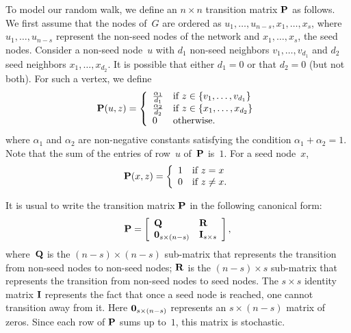 To model our random walk, we define an $n \times n$ transition matrix $\mathbf{P}$ 
as follows. We first assume that the nodes of~$G$ are ordered as 
$u_1, \ldots, u_{n - s}, x_{1}, \ldots, x_{s}$, where $u_1, \ldots, u_{n - s}$
represent the non-seed nodes of the network and $x_1, \ldots, x_s$, the seed nodes.
Consider a non-seed node~$u$ with $d_1$ non-seed neighbors $v_1, \ldots, v_{d_1}$
and $d_2$ seed neighbors $x_1, \ldots, x_{d_2}$. It is possible that either $d_1 = 0$
or that $d_2 = 0$ (but not both). For such a vertex, we define
\begin{equation}\label{eqn:defining_prob_nonseed}
	\mathbf{P}(u, z) = \left \{ 
							\begin{array}{ll}
								\frac{\alpha_1}{d_1} & \mbox{if } z \in \{v_1, \ldots, v_{d_1}\} \\
                                \frac{\alpha_2}{d_2} & \mbox{if } z \in \{x_1, \ldots, x_{d_2}\} \\
								0			& \mbox{otherwise.}
							\end{array}
						\right.
\end{equation}
where $\alpha_1$ and $\alpha_2$ are non-negative constants satisfying the condition
$\alpha_1 + \alpha_2 = 1$. Note that the sum of the entries of row~$u$ of~$\mathbf{P}$
is~$1$. 
For a seed node~$x$, 
\begin{equation}\label{eqn:defining_prob_seed}
	\mathbf{P}(x,z) = 	\left \{ 
						\begin{array}{ll}
							1 & \mbox{if $z = x$} \\
							0 & \mbox{if $z \neq x$.}
						\end{array}
					\right.
\end{equation}

It is usual to write the transition matrix $\mathbf{P}$ in the following canonical form:
\begin{equation}\label{eqn:canonical_form_P}
	\mathbf{P} = 	\left [ \begin{array}{ll}
						\mathbf{Q}  & \mathbf{R} \\
						 \mathbf{0}_{s \times (n - s)} & \mathbf{I}_{s \times s}
						\end{array}
				\right ],
\end{equation}
where~$\mathbf{Q}$ is the $(n - s) \times (n - s)$ sub-matrix that represents the transition 
from non-seed nodes to non-seed nodes; $\mathbf{R}$ is the $(n - s) \times s$ sub-matrix 
that represents the transition from non-seed nodes to seed nodes. The $s \times s$ identity 
matrix $\mathbf{I}$ represents the fact that once a seed node is reached, one cannot transition away 
from it. Here $\mathbf{0}_{s \times (n - s)}$ represents an $s \times (n - s)$ matrix of zeros. 
Since each row of $\mathbf{P}$ sums up to~$1$, this matrix is stochastic.

